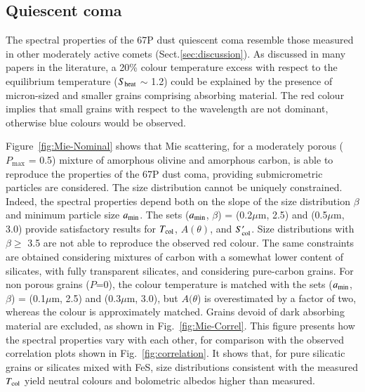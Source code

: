 \documentclass[a4paper,fleqn,usenatbib]{mnras}
\begin{document}
\subsection{Quiescent coma}
\label{sec:background}

The spectral properties of the 67P dust quiescent coma resemble those measured in other moderately active comets (Sect.\ref{sec:discussion}). As discussed in many papers in the literature, a 20\% colour temperature excess with respect to the equilibrium temperature ($S_{\rm heat}$ $\sim$ 1.2) could be explained by the presence of micron-sized and smaller grains comprising absorbing material. The red colour implies that small grains with respect to the wavelength are not dominant, otherwise blue colours would be observed.


Figure~\ref{fig:Mie-Nominal} shows that Mie scattering, for a moderately porous ($P_{\max}$ = 0.5) mixture of amorphous olivine and amorphous carbon, is able to reproduce the properties of the 67P dust coma, providing submicrometric particles are considered. The size distribution cannot be uniquely constrained. Indeed, the spectral properties depend both on the slope of the size distribution $\beta$ and minimum particle size $a_{\rm min}$. The sets ($a_{\rm min}$, $\beta$) = (0.2$\mu$m, 2.5) and (0.5$\mu$m, 3.0) provide satisfactory results for $T_{\rm col}$, $A(\theta)$, and $S'_{\rm col}$. Size distributions with $\beta \geq$ 3.5 are not able to reproduce the observed red colour. The same constraints are obtained considering mixtures of carbon with a somewhat lower content of silicates, with fully transparent silicates, and considering pure-carbon grains. For non porous grains ($P$=0), the colour temperature is matched with the  sets ($a_{\rm min}$, $\beta$) = (0.1$\mu$m, 2.5) and (0.3$\mu$m, 3.0), but $A(\theta$) is overestimated by a factor of two, whereas the colour is approximately matched.  Grains devoid of dark absorbing material are excluded, as shown in Fig.~\ref{fig:Mie-Correl}. This figure presents how the spectral properties vary with each other, for comparison with the observed correlation plots shown in Fig.~\ref{fig:correlation}.  It shows that, for pure silicatic grains or silicates mixed with FeS, size distributions consistent with the measured $T_{\rm col}$ yield neutral colours and bolometric albedos higher than measured.
\end{document}

